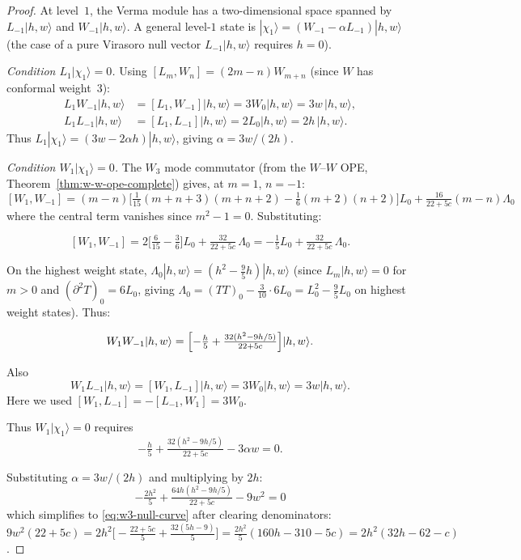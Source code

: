 \begin{proof}
At level~$1$, the Verma module has a two-dimensional space spanned
by $L_{-1}|h,w\rangle$ and $W_{-1}|h,w\rangle$.  A general
level-$1$ state is
$|\chi_1\rangle = (W_{-1} - \alpha L_{-1})|h,w\rangle$
(the case of a pure Virasoro null vector $L_{-1}|h,w\rangle$
requires $h = 0$).

\emph{Condition $L_1|\chi_1\rangle = 0$.}
Using $[L_m, W_n] = (2m - n)W_{m+n}$ (since $W$ has
conformal weight~$3$):
\begin{align}
L_1 W_{-1}|h,w\rangle &= [L_1, W_{-1}]|h,w\rangle
  = 3W_0|h,w\rangle = 3w\,|h,w\rangle, \nonumber \\
L_1 L_{-1}|h,w\rangle &= [L_1, L_{-1}]|h,w\rangle
  = 2L_0|h,w\rangle = 2h\,|h,w\rangle. \nonumber
\end{align}
Thus $L_1|\chi_1\rangle = (3w - 2\alpha h)|h,w\rangle$, giving
$\alpha = 3w/(2h)$.

\emph{Condition $W_1|\chi_1\rangle = 0$.}
The $W_3$ mode commutator (from the $W$--$W$ OPE,
Theorem~\ref{thm:w-w-ope-complete}) gives, at $m = 1$, $n = -1$:
\[
[W_1, W_{-1}]
  = (m{-}n)\bigl[\tfrac{1}{15}(m{+}n{+}3)(m{+}n{+}2)
    - \tfrac{1}{6}(m{+}2)(n{+}2)\bigr]L_0
  + \tfrac{16}{22+5c}(m{-}n)\Lambda_0
\]
where the central term vanishes since $m^2 - 1 = 0$.  Substituting:

\[
[W_1, W_{-1}]
  = 2\bigl[\tfrac{6}{15} - \tfrac{3}{6}\bigr]L_0
    + \tfrac{32}{22+5c}\,\Lambda_0
  = -\tfrac{1}{5}L_0 + \tfrac{32}{22+5c}\,\Lambda_0.
\]

On the highest weight state,
$\Lambda_0|h,w\rangle = (h^2 - \frac{9}{5}h)|h,w\rangle$
(since $L_m|h,w\rangle = 0$ for $m > 0$ and
$(\partial^2 T)_0 = 6L_0$, giving
$\Lambda_0 = (TT)_0 - \frac{3}{10}\cdot 6L_0
  = L_0^2 - \frac{9}{5}L_0$ on highest weight states).  Thus:

\[
W_1 W_{-1}|h,w\rangle = \Bigl[-\tfrac{h}{5}
  + \tfrac{32(h^2 - 9h/5)}{22+5c}\Bigr]|h,w\rangle.
\]

Also
\[
W_1 L_{-1}|h,w\rangle = [W_1, L_{-1}]|h,w\rangle
= 3W_0|h,w\rangle = 3w|h,w\rangle.
\]
Here we used $[W_1, L_{-1}] = -[L_{-1}, W_1] = 3W_0$.

Thus $W_1|\chi_1\rangle = 0$ requires
\[
-\tfrac{h}{5} + \tfrac{32(h^2 - 9h/5)}{22+5c}
  - 3\alpha w = 0.
\]

Substituting $\alpha = 3w/(2h)$ and multiplying by $2h$:
\[
-\tfrac{2h^2}{5}
  + \tfrac{64h(h^2 - 9h/5)}{22+5c} - 9w^2 = 0
\]
which simplifies to \eqref{eq:w3-null-curve} after clearing
denominators:
$9w^2(22+5c) = 2h^2\bigl[-\frac{22+5c}{5}
  + \frac{32(5h-9)}{5}\bigr]
  = \frac{2h^2}{5}(160h - 310 - 5c)
  = 2h^2(32h - 62 - c)$.
\end{proof}


